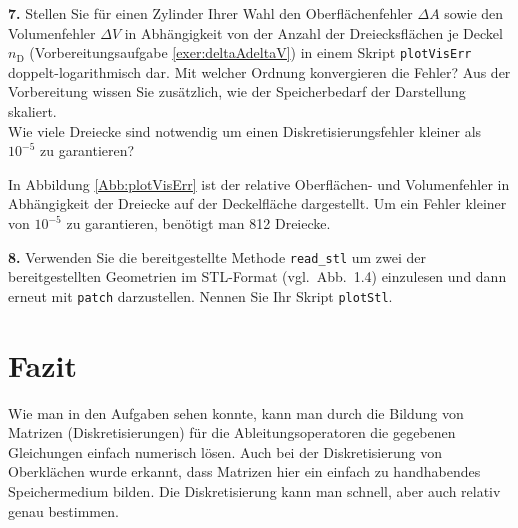 \documentclass[Protokollheft.tex]{subfiles}
\begin{document}
	
	
	\begin{framed}
		\noindent \textbf{7.} Stellen Sie für einen Zylinder Ihrer Wahl den Oberflächenfehler $\Delta A$ sowie den Volumenfehler $\Delta V$ in Abhängigkeit von der Anzahl der Dreiecksflächen je Deckel $n_\text{D}$ (Vorbereitungsaufgabe \ref{exer:deltaAdeltaV}) in einem Skript
		\lstinline{plotVisErr} doppelt-logarithmisch dar.   Mit welcher Ordnung konvergieren die Fehler?
		Aus der Vorbereitung wissen Sie zusätzlich, wie der Speicherbedarf der
		Darstellung skaliert.\\
		Wie viele Dreiecke sind notwendig um einen Diskretisierungsfehler kleiner als $10^{-5}$ zu garantieren?\label{exer:plotVisErr}
	\end{framed}
	\noindent
	In Abbildung \ref{Abb:plotVisErr} ist der relative Oberflächen- und Volumenfehler in Abhängigkeit der Dreiecke auf der Deckelfläche dargestellt. Um ein Fehler kleiner von $10^{-5}$ zu garantieren, benötigt man 812 Dreiecke.
	
	
	\begin{framed}
		\noindent \textbf{8.} Verwenden Sie die bereitgestellte Methode \lstinline{read_stl} um zwei der bereitgestellten Geometrien im STL-Format (vgl.~Abb.~1.4) einzulesen und dann erneut mit \lstinline{patch} darzustellen.
		Nennen Sie Ihr Skript \lstinline{plotStl}.\label{exer:plotStl}
	\end{framed}
	
	
	
	\section{Fazit}
	Wie man in den Aufgaben sehen konnte, kann man durch die Bildung von Matrizen (Diskretisierungen) für die Ableitungsoperatoren die gegebenen Gleichungen einfach numerisch lösen. Auch bei der Diskretisierung von Oberklächen wurde erkannt, dass Matrizen hier ein einfach zu handhabendes Speichermedium bilden. Die Diskretisierung kann man schnell, aber auch relativ genau bestimmen.
	
\end{document}
